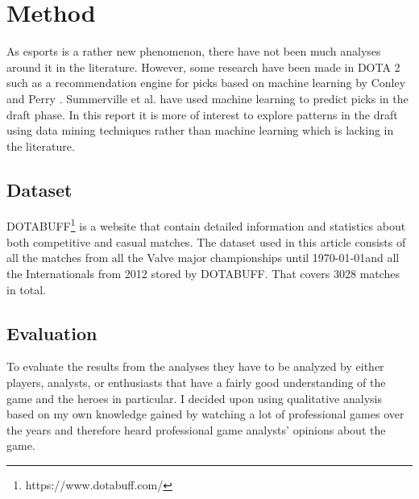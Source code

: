 \documentclass[report.tex]{subfiles}
\begin{document}
\section*{\centering Method}

As esports is a rather new phenomenon, there have not been much analyses around it in the literature. However, some research have been made in DOTA 2 such as a recommendation engine for picks based on machine learning by Conley and Perry \cite{conley2013does}. Summerville et al. \cite{cook2016draft} have used machine learning to predict picks in the draft phase. In this report it is more of interest to explore patterns in the draft using data mining techniques rather than machine learning which is lacking in the literature.

\subsection*{Dataset}

DOTABUFF\footnote{https://www.dotabuff.com/} is a website that contain detailed information and statistics about both competitive and casual matches. The dataset used in this article consists of all the matches from all the Valve major championships until \today and all the Internationals from 2012 stored by DOTABUFF. That covers 3028 matches in total.

\subsection*{Evaluation}

To evaluate the results from the analyses they have to be analyzed by either players, analysts, or enthusiasts that have a fairly good understanding of the game and the heroes in particular. I decided upon using qualitative analysis based on my own knowledge gained by watching a lot of professional games over the years and therefore heard professional game analysts' opinions about the game.
\end{document}
